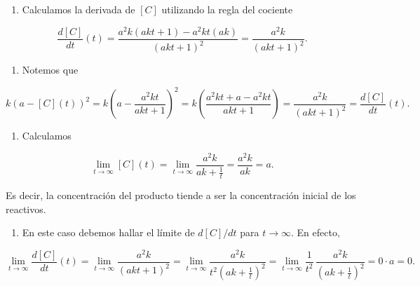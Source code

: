 \documentclass[
  letterpaper,
]{book}
\providecommand{\tightlist}{%
  \setlength{\itemsep}{0pt}\setlength{\parskip}{0pt}}
\theoremstyle{plain}
\theoremstyle{remark}
\begin{document}
\begin{tcolorbox}[enhanced jigsaw, opacityback=0, left=2mm, opacitybacktitle=0.6, toprule=.15mm, bottomrule=.15mm, colbacktitle=quarto-callout-tip-color!10!white, titlerule=0mm, bottomtitle=1mm, title=\textcolor{quarto-callout-tip-color}{\faLightbulb}\hspace{0.5em}{Solución}, toptitle=1mm, colframe=quarto-callout-tip-color-frame, colback=white, breakable, rightrule=.15mm, arc=.35mm, leftrule=.75mm, coltitle=black]

\begin{enumerate}
\def\labelenumi{\arabic{enumi}.}
\tightlist
\item
  Calculamos la derivada de \([C]\) utilizando la regla del cociente
\end{enumerate}

\[
\frac{d[C]}{dt}(t)=\frac{a^2k(akt+1)-a^2kt(ak)}{(akt+1)^2}=\frac{a^2k}{(akt+1)^2}.
\]

\begin{enumerate}
\def\labelenumi{\arabic{enumi}.}
\setcounter{enumi}{1}
\tightlist
\item
  Notemos que
\end{enumerate}

\[
k(a-[C](t))^2=k\left(a-\frac{a^2kt}{akt+1}\right)^2=k\left(\frac{a^2kt+a-a^2kt}{akt+1}\right)=\frac{a^2k}{(akt+1)^2}=\frac{d[C]}{dt}(t).
\]

\begin{enumerate}
\def\labelenumi{\arabic{enumi}.}
\setcounter{enumi}{2}
\tightlist
\item
  Calculamos
\end{enumerate}

\[
\lim_{t\to \infty} [C](t)=\lim_{t\to \infty} \frac{a^2k}{ak+\frac{1}{t}}=\frac{a^2k}{ak}=a.
\]

Es decir, la concentración del producto tiende a ser la concentración
inicial de los reactivos.

\begin{enumerate}
\def\labelenumi{\arabic{enumi}.}
\setcounter{enumi}{3}
\tightlist
\item
  En este caso debemos hallar el límite de \(d[C]/dt\) para
  \(t\to\infty\). En efecto,
\end{enumerate}

\[
\lim_{t\to \infty} \frac{d[C]}{dt}(t)=\lim_{t\to \infty} \frac{a^2k}{(akt+1)^2}=\lim_{t\to \infty} \frac{a^2k}{t^2(ak+\frac{1}{t})^2}=\lim_{t\to \infty} \frac{1}{t^2}\,\frac{a^2k}{(ak+\frac{1}{t})^2}=0\cdot a=0.
\]

\end{tcolorbox}
\end{document}
